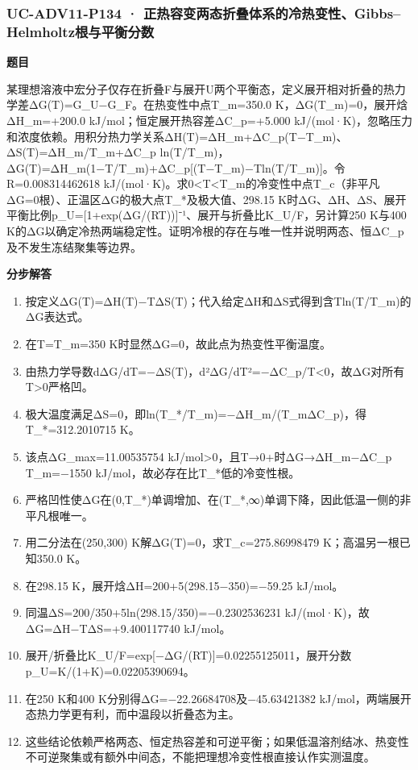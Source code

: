 \documentclass[UTF8,11pt,a4paper]{ctexart}
\begin{document}
\subsubsection*{UC-ADV11-P134 · 正热容变两态折叠体系的冷热变性、Gibbs–Helmholtz根与平衡分数}
\noindent\textbf{题目}\par
某理想溶液中宏分子仅存在折叠F与展开U两个平衡态，定义展开相对折叠的热力学差ΔG(T)=G\_U−G\_F。在热变性中点T\_m=350.0 K，ΔG(T\_m)=0，展开焓ΔH\_m=+200.0 kJ/mol；恒定展开热容差ΔC\_p=+5.000 kJ/(mol·K)，忽略压力和浓度依赖。用积分热力学关系ΔH(T)=ΔH\_m+ΔC\_p(T−T\_m)、ΔS(T)=ΔH\_m/T\_m+ΔC\_p ln(T/T\_m)，ΔG(T)=ΔH\_m(1−T/T\_m)+ΔC\_p[(T−T\_m)−Tln(T/T\_m)]。令R=0.008314462618 kJ/(mol·K)。求0<T<T\_m的冷变性中点T\_c（非平凡ΔG=0根）、正温区ΔG的极大点T\_*及极大值、298.15 K时ΔG、ΔH、ΔS、展开平衡比例p\_U=[1+exp(ΔG/(RT))]⁻¹、展开与折叠比K\_U/F，另计算250 K与400 K的ΔG以确定冷热两端稳定性。证明冷根的存在与唯一性并说明两态、恒ΔC\_p及不发生冻结聚集等边界。\par
\medskip\noindent\textbf{分步解答}
\begin{enumerate}
\item 按定义ΔG(T)=ΔH(T)−TΔS(T)；代入给定ΔH和ΔS式得到含Tln(T/T\_m)的ΔG表达式。
\item 在T=T\_m=350 K时显然ΔG=0，故此点为热变性平衡温度。
\item 由热力学导数dΔG/dT=−ΔS(T)，d²ΔG/dT²=−ΔC\_p/T<0，故ΔG对所有T>0严格凹。
\item 极大温度满足ΔS=0，即ln(T\_*/T\_m)=−ΔH\_m/(T\_mΔC\_p)，得T\_*=312.2010715 K。
\item 该点ΔG\_max=11.00535754 kJ/mol>0，且T→0+时ΔG→ΔH\_m−ΔC\_p T\_m=−1550 kJ/mol，故必存在比T\_*低的冷变性根。
\item 严格凹性使ΔG在(0,T\_*)单调增加、在(T\_*,∞)单调下降，因此低温一侧的非平凡根唯一。
\item 用二分法在(250,300) K解ΔG(T)=0，求T\_c=275.86998479 K；高温另一根已知350.0 K。
\item 在298.15 K，展开焓ΔH=200+5(298.15−350)=−59.25 kJ/mol。
\item 同温ΔS=200/350+5ln(298.15/350)=−0.2302536231 kJ/(mol·K)，故ΔG=ΔH−TΔS=+9.400117740 kJ/mol。
\item 展开/折叠比K\_U/F=exp[−ΔG/(RT)]=0.02255125011，展开分数p\_U=K/(1+K)=0.02205390694。
\item 在250 K和400 K分别得ΔG=−22.26684708及−45.63421382 kJ/mol，两端展开态热力学更有利，而中温段以折叠态为主。
\item 这些结论依赖严格两态、恒定热容差和可逆平衡；如果低温溶剂结冰、热变性不可逆聚集或有额外中间态，不能把理想冷变性根直接认作实测温度。
\end{enumerate}
\end{document}
